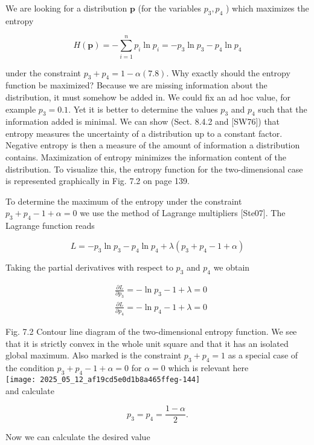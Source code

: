 \documentclass[10pt]{article}
\begin{document}
We are looking for a distribution $\boldsymbol{p}$ (for the variables $p_{3}, p_{4}$ ) which maximizes the entropy


\begin{equation*}
H(\boldsymbol{p})=-\sum_{i=1}^{n} p_{i} \ln p_{i}=-p_{3} \ln p_{3}-p_{4} \ln p_{4} \tag{7.9}
\end{equation*}


under the constraint $p_{3}+p_{4}=1-\alpha(7.8)$. Why exactly should the entropy function be maximized? Because we are missing information about the distribution, it must somehow be added in. We could fix an ad hoc value, for example $p_{3}=0.1$. Yet it is better to determine the values $p_{3}$ and $p_{4}$ such that the information added is minimal. We can show (Sect. 8.4.2 and [SW76]) that entropy measures the uncertainty of a distribution up to a constant factor. Negative entropy is then a measure of the amount of information a distribution contains. Maximization of entropy minimizes the information content of the distribution. To visualize this, the entropy function for the two-dimensional case is represented graphically in Fig. 7.2 on page 139.

To determine the maximum of the entropy under the constraint $p_{3}+p_{4}-1+\alpha=0$ we use the method of Lagrange multipliers [Ste07]. The Lagrange function reads

$$
L=-p_{3} \ln p_{3}-p_{4} \ln p_{4}+\lambda\left(p_{3}+p_{4}-1+\alpha\right)
$$

Taking the partial derivatives with respect to $p_{3}$ and $p_{4}$ we obtain

$$
\begin{aligned}
& \frac{\partial L}{\partial p_{3}}=-\ln p_{3}-1+\lambda=0 \\
& \frac{\partial L}{\partial p_{4}}=-\ln p_{4}-1+\lambda=0
\end{aligned}
$$

Fig. 7.2 Contour line diagram of the two-dimensional entropy function. We see that it is strictly convex in the whole unit square and that it has an isolated global maximum. Also marked is the constraint $p_{3}+p_{4}=1$ as a special case of the condition $p_{3}+p_{4}-1+\alpha=0$ for $\alpha=0$ which is relevant here\\
\texttt{[image: 2025\_05\_12\_af19cd5e0d1b8a465ffeg-144]}\\
and calculate

$$
p_{3}=p_{4}=\frac{1-\alpha}{2} .
$$

Now we can calculate the desired value
\end{document}
